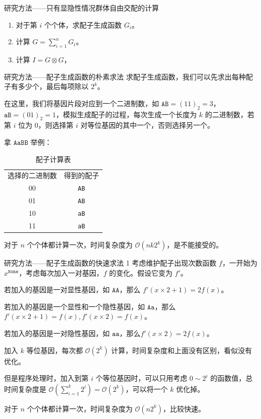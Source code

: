 \documentclass{beamer}
\begin{document}
	\begin{frame}{研究方法——只有显隐性情况群体自由交配的计算}
		\begin{enumerate}
			\item 对于第 $i$ 个个体，求配子生成函数 $G_i$。
			\item 计算 $G=\sum_{i=1}^n G_i$。 
			\item 计算 $I=G \otimes G$，
		\end{enumerate}
	\end{frame}

	\begin{frame}{研究方法——配子生成函数的朴素求法}
		求配子生成函数，我们可以先求出每种配子有多少个，最后每项除以 $2^k$。 
		
		在这里，我们将基因片段对应到一个二进制数，如 $\texttt{AB}=(11)_2=3$，$\texttt{aB}=(01)_2=1$，模拟生成配子的过程，每次生成一个长度为 $k$ 的二进制数，若第 $i$ 位为 $0$，则选择第 $i$ 对等位基因的其中一个，否则选择另一个。
		
		拿 $\texttt{AaBB}$ 举例：
		
		\begin{table}[htbp]
			\centering
			\caption{配子计算表}
			\begin{tabular}{|c|c|}
				选择的二进制数 & 得到的配子 \\
				00 & \texttt{AB} \\
				01 & \texttt{AB} \\
				10 & \texttt{aB} \\
				11 & \texttt{aB} \\
			\end{tabular}
		\end{table}
		
		对于 $n$ 个个体都计算一次，时间复杂度为 $\mathcal O(nk 2^k)$，是不能接受的。
	\end{frame}

	\begin{frame}{研究方法——配子生成函数的快速求法 1}
		考虑维护配子出现次数函数 $f$，一开始为 $x^{\texttt{None}}$，考虑每次加入一对基因，$f$ 的变化。假设它变为 $f'$。
		
		若加入的基因是一对显性基因，如 $\texttt{AA}$，那么 $f'(x \times 2 + 1)=2f(x)$。
		
		若加入的基因是一个显性和一个隐性基因，如 $\texttt{Aa}$，那么 $f'(x \times 2 + 1)=f(x),f'(x \times 2)=f(x)$。
		
		若加入的基因是一对隐性基因，如 $\texttt{aa}$，那么$f'(x \times 2)=2f(x)$。
		
		加入 $k$ 等位基因，每次都 $\mathcal O(2^k)$ 计算，时间复杂度和上面没有区别，看似没有优化。
		
		但是程序处理时，加入到第 $i$ 个等位基因时，可以只用考虑 $0 \sim 2^i$ 的函数值，总时间复杂度是 $\mathcal O(\sum_{i=1}^k 2^i)=\mathcal O(2^k)$，可以将一个 $k$ 优化掉。
		
		对于 $n$ 个个体都计算一次，时间复杂度为 $\mathcal O(n2^k)$，比较快速。
	\end{frame}
\end{document}
